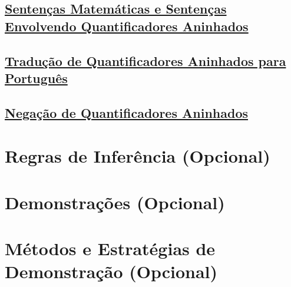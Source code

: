 \subsection*{\underline{Sentenças Matemáticas e Sentenças Envolvendo Quantificadores
Aninhados}}
\subsection*{\underline{Tradução de Quantificadores Aninhados para Português}}
\subsection*{\underline{Negação de Quantificadores Aninhados}}

\section{Regras de Inferência (Opcional)}
\section{Demonstrações (Opcional)}
\section{Métodos e Estratégias de Demonstração (Opcional)}